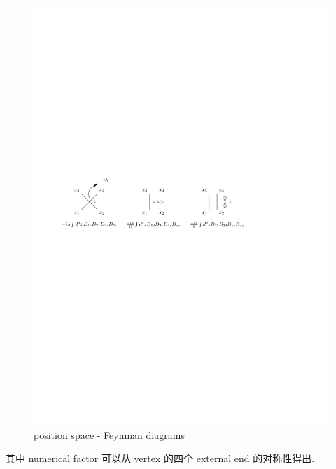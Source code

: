 \begin{itemize}
	\begin{figure}[H]
		\centering
		\includegraphics[scale=1]{figures/collision between particles - Feynman diagrams.pdf}
		\caption{position space - Feynman diagrams}
	\end{figure}
	
	其中 numerical factor 可以从 vertex 的四个 external end 的对称性得出.
	

\end{itemize}

